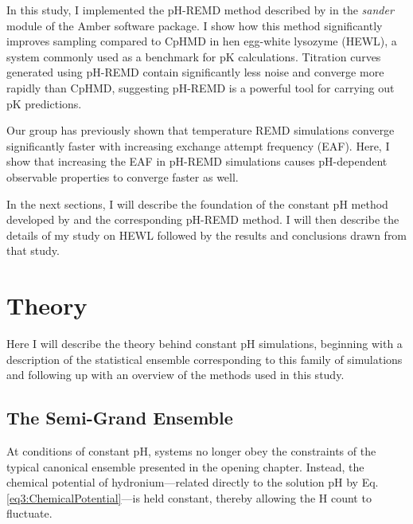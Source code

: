 In this study, I implemented the pH-REMD method described by
\citeauthor{Itoh_Proteins_2011_v79_p3420} \cite{Itoh_Proteins_2011_v79_p3420} in
the \emph{sander} module of the Amber \cite{AMBER12} software package. I show
how this method significantly improves sampling compared to CpHMD in hen
egg-white lysozyme (HEWL), a system commonly used as a benchmark for pK
calculations. Titration curves generated using pH-REMD contain significantly
less noise and converge more rapidly than CpHMD, suggesting pH-REMD is a
powerful tool for carrying out pK predictions.

Our group has previously shown that temperature REMD simulations converge
significantly faster with increasing exchange attempt frequency (EAF).
\cite{Sindhikara2008,Sindhikara2010} Here, I show that increasing the EAF in
pH-REMD simulations causes pH-dependent observable properties to converge faster
as well.

In the next sections, I will describe the foundation of the constant pH method
developed by \citeauthor{Mongan_JComputChem_2004_v25_p2038}
\cite{Mongan_JComputChem_2004_v25_p2038} and the corresponding pH-REMD method.
\cite{Itoh_Proteins_2011_v79_p3420, Wallace_JChemTheoryComput_2011_v7_p2617} I
will then describe the details of my study on HEWL followed by the results and
conclusions drawn from that study.

\section{Theory}

Here I will describe the theory behind constant pH simulations, beginning with a
description of the statistical ensemble corresponding to this family of
simulations and following up with an overview of the methods used in this study.

\subsection{The Semi-Grand Ensemble}

At conditions of constant pH, systems no longer obey the constraints of the
typical canonical ensemble presented in the opening chapter. Instead, the
chemical potential of hydronium---related directly to the solution pH by Eq.
\ref{eq3:ChemicalPotential}---is held constant, thereby allowing the H\super{+}
count to fluctuate.


